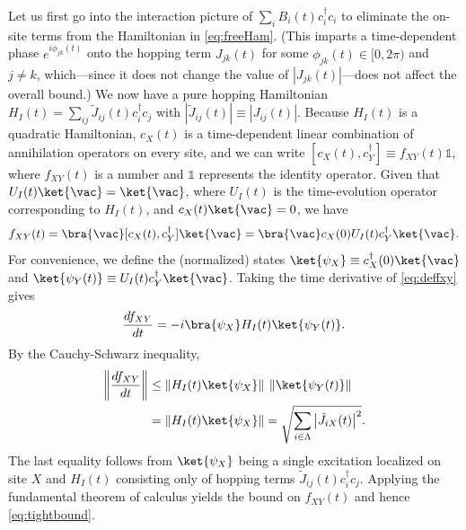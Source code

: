 Let us first go into the interaction picture of $\sum_i B_{i}(t)c_i^\dagger c_i$ to eliminate the on-site terms from the Hamiltonian in \cref{eq:freeHam}.
(This imparts a time-dependent phase $e^{i\phi_{jk}(t)}$ onto the hopping term $J_{jk}(t)$ for some $\phi_{jk}(t)\in[0,2\pi)$ and $j\neq k$, which---since it does not change the value of $|J_{jk}(t)|$---does not affect the overall bound.)
We now have a pure hopping Hamiltonian $ H_I(t) = \sum_{ij} \tilde J_{ij}(t)c_i^\dagger c_j$ with $|\tilde J_{ij}(t)|\equiv|J_{ij}(t)|$.
Because $ H_I(t)$ is a quadratic Hamiltonian, $c_X(t)$ is a time-dependent linear combination of annihilation operators on every site, and we can write $[c_X(t), c^\dagger_Y] \equiv f_{XY}(t) \mathds{1}$, where $f_{XY}(t)$ is a number and $\mathds{1}$ represents the identity operator.
Given that $U_I(t)\ket{\vac}=\ket{\vac}$, where $U_I(t)$ is the time-evolution operator corresponding to $H_I(t)$, and $c_X(t)\ket{\vac}=0$, we have
\begin{equation}
	\label{eq:deffxy}
	f_{XY}(t) = \bra{\vac}[c_X(t), c^\dagger_Y]\ket{\vac} = \bra{\vac} c_X(0)U_I(t)c^\dagger_Y \ket{\vac}.
\end{equation}
For convenience, we define the (normalized) states $\ket{\psi_X} \equiv c^\dagger_X(0)\ket{\vac}$ and $\ket{\psi_Y(t)} \equiv U_I(t)c_Y^\dagger\ket{\vac}$. Taking the time derivative of \cref{eq:deffxy} gives
\begin{equation}
	\label{eq:onelineproof}
	\frac{df_{XY}}{dt} = -i\bra{\psi_X} H_I(t)\ket{\psi_Y(t)}.
\end{equation}
By the Cauchy-Schwarz inequality,
\begin{align}
\left\Vert  \frac{df_{XY}}{dt}\right\Vert &\le \left\Vert H_I(t)\ket{\psi_X} \right \Vert \: \left\Vert \ket{\psi_Y(t)} \right \Vert\\
&=\left\Vert H_I(t)\ket{\psi_X} \right \Vert= \sqrt{\sum_{i\in\Lambda}\left| \tilde J_{iX}(t)\right|^{2}}.
\end{align}
The last equality follows from $\ket{\psi_X}$ being a single excitation localized on site $X$ and $ H_I(t)$ consisting only of hopping terms $\tilde J_{ij}(t)c_i^\dagger c_j$. Applying the fundamental theorem of calculus yields the bound on  $f_{XY}(t)$ and hence \cref{eq:tightbound}.

